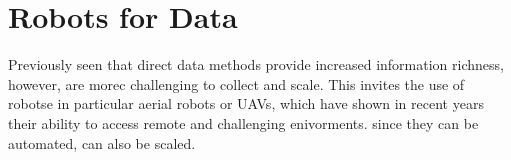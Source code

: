 



\section{Robots for Data}


Previously seen that direct data methods provide increased information richness, however, are morec challenging to collect and scale. This invites the use of robotse in particular aerial robots or UAVs, which have shown in recent years their ability to access remote and challenging enivorments. since they can be automated, can also be scaled.

